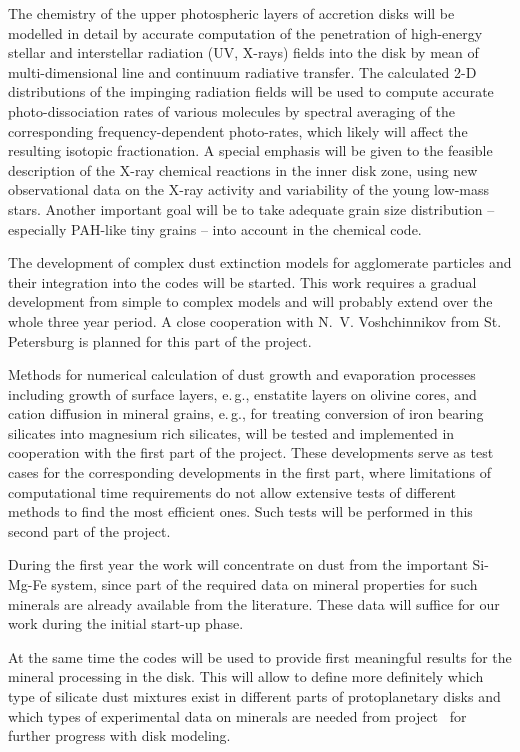 The chemistry of the upper photospheric layers of accretion disks
will be modelled in detail by accurate computation of the
penetration of high-energy stellar and interstellar radiation (UV,
X-rays) fields into the disk by mean of multi-dimensional line and
continuum radiative transfer. The calculated 2-D distributions of
the impinging radiation fields will be used to compute accurate
photo-dissociation rates of various molecules by spectral averaging
of the corresponding frequency-dependent photo-rates, which likely
will affect the resulting isotopic fractionation. A special
emphasis will be given to the feasible description of the X-ray
chemical reactions in the inner disk zone, using new observational
data on the X-ray activity and variability of the young low-mass
stars. Another important goal will be to take adequate grain size
distribution -- especially PAH-like tiny grains -- into account in
the chemical code.

The development of complex dust extinction models for agglomerate
particles and their integration into the codes will be started.
This work requires a gradual development from simple to complex
models and will probably extend over the whole three year period.
A close cooperation with  N.~V. Voshchinnikov from St. Petersburg
is planned for this part of the project.

Methods for numerical calculation of dust growth and evaporation
processes including growth of surface layers, e.\,g., enstatite
layers on olivine cores, and cation diffusion in mineral grains,
e.\,g., for treating conversion of iron bearing silicates into
magnesium rich silicates, will be tested and implemented in
cooperation with the first part of the project. These developments
serve as test cases for the corresponding developments in the
first part, where limitations of computational time requirements
do not allow extensive tests of different methods to find the most
efficient ones. Such tests will be performed in this second part
of the project.

During the first year the work will concentrate on dust from the
important Si-Mg-Fe system, since part of the required data on
mineral properties for such minerals are already available from
the literature. These data will suffice for our work during the
initial start-up phase.

At the same time the codes will be used to provide first
meaningful results for the mineral processing in the disk. This
will allow to define more definitely which type of silicate dust
mixtures exist in different parts of protoplanetary disks and
which types of experimental data on minerals are needed from
project \projlattard\ for further progress with disk modeling.

